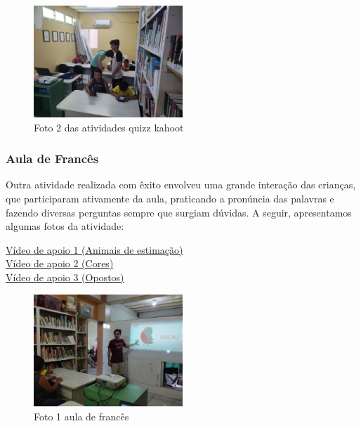 \documentclass[a4paper,12pt]{article}
\begin{document}
\vspace{1cm}

\begin{figure}[h]
    \centering
    \includegraphics[width=0.5\textwidth]{imagem2.png}
    \caption{Foto 2 das atividades quizz kahoot}
    \label{fig:foto1505}
\end{figure}

\newpage

\subsubsection{Aula de Francês}
Outra atividade realizada com êxito envolveu uma grande interação das crianças, que participaram ativamente da aula, praticando a pronúncia das palavras e fazendo diversas perguntas sempre que surgiam dúvidas. A seguir, apresentamos algumas fotos da atividade:

\vspace{1cm}

\href{https://youtu.be/hx6BJ9j1B3M?si=gRjxKt_P_RIAn7jv}{Vídeo de apoio 1 (Animais de estimação)}\\

\href{https://youtu.be/DAjssWEquzM?si=hfMAgDxSrmBPtaai}{Vídeo de apoio 2 (Cores)}\\

\href{https://youtu.be/mGy9uM4Dk8E?si=Gd58lWWFJuV8rbko}{Vídeo de apoio 3 (Opostos)}\\

\begin{figure}[h]
    \centering
    \includegraphics[width=0.5\textwidth]{imagem4.png}
    \caption{Foto 1 aula de francês}
    \label{fig:foto1505}
\end{figure}
\end{document}
